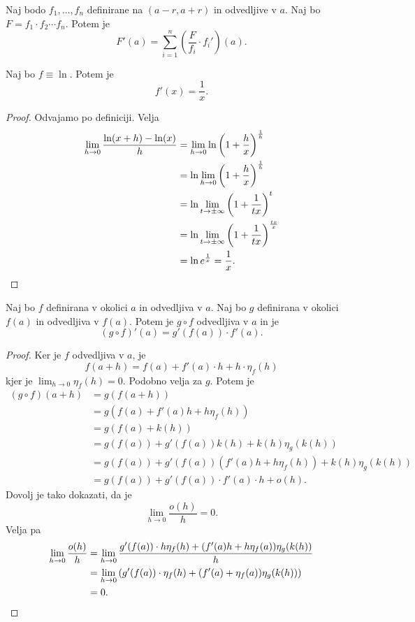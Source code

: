 \documentclass[12pt, a4paper]{article}
\begin{document}
\begin{posledica}
Naj bodo $f_1,\dots,f_n$ definirane na $(a-r,a+r)$ in odvedljive v $a$. Naj bo $F=f_1\cdot f_2\cdots f_n$. Potem je
\[
F'(a)=\sum_{i=1}^n\left(\frac{F}{f_i}\cdot f_i'\right)(a).
\]
\end{posledica}

\begin{posledica}
Naj bo $f\equiv\ln$. Potem je
\[
f'(x)=\frac{1}{x}.
\]
\end{posledica}

\begin{proof}
Odvajamo po definiciji. Velja
\begin{align*}
\lim_{h\to 0}\frac{\ln(x+h)-\ln(x)}{h}
&=\lim_{h\to 0}\ln\left(1+\frac{h}{x}\right)^{\frac{1}{h}}
\\
&=\ln\lim_{h\to 0}\left(1+\frac{h}{x}\right)^{\frac{1}{h}}
\\
&=\ln\lim_{t\to\pm\infty}\left(1+\frac{1}{tx}\right)^t
\\
&=\ln\lim_{t\to\pm\infty}\left(1+\frac{1}{tx}\right)^{\frac{tx}{x}}
\\
&=\ln e^{\frac{1}{x}}=\frac{1}{x}.\qedhere
\end{align*}
\end{proof}

\begin{izrek}
Naj bo $f$ definirana v okolici $a$ in odvedljiva v $a$. Naj bo $g$ definirana v okolici $f(a)$ in odvedljiva v $f(a)$. Potem je $g\circ f$ odvedljiva v $a$ in je
\[
(g\circ f)'(a)=g'(f(a))\cdot f'(a).
\]
\end{izrek}

\begin{proof}
Ker je $f$ odvedljiva v $a$, je
\[
f(a+h)=f(a)+f'(a)\cdot h+h\cdot\eta_f(h)
\]
kjer je $\displaystyle\lim_{h\to 0}\eta_f(h)=0$. Podobno velja za $g$. Potem je
\begin{align*}
(g\circ f)(a+h)&=g(f(a+h))
\\
&=g(f(a)+f'(a)h+h\eta_f(h))
\\
&=g(f(a)+k(h))
\\
&=g(f(a))+g'(f(a))k(h)+k(h)\eta_g(k(h))
\\
&=g(f(a))+g'(f(a))\left(f'(a)h+h\eta_f(h)\right)+k(h)\eta_g(k(h))
\\
&=g(f(a))+g'(f(a))\cdot f'(a)\cdot h+o(h).
\end{align*}
Dovolj je tako dokazati, da je
\[
\lim_{h\to 0}\frac{o(h)}{h}=0.
\]
Velja pa
\begin{align*}
\lim_{h\to 0}\frac{o(h)}{h}&=\lim_{h\to 0}\frac{g'(f(a))\cdot h\eta_f(h)+(f'(a)h+h\eta_f(a))\eta_g(k(h))}{h}
\\
&=\lim_{h\to 0}\left(g'(f(a))\cdot \eta_f(h)+(f'(a)+\eta_f(a))\eta_g(k(h))\right)
\\
&=0.\qedhere
\end{align*}
\end{proof}
\end{document}

